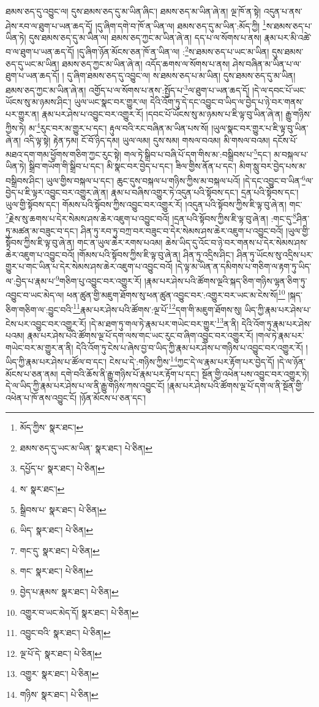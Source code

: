 ཐམས་ཅད་དུ་འབྱུང་ལ། དུས་ཐམས་ཅད་དུ་མ་ཡིན་ཞིང་། ཐམས་ཅད་མ་ཡིན་ཞེ་ན། ལྔ་ཁོ་ན་སྟེ། འདུན་པ་ནས་ཤེས་རབ་ལ་ཐུག་པ་ཡན་ཆད་དོ། །དུ་ཞིག་དགེ་བ་ཁོ་ན་ཡིན་ལ། ཐམས་ཅད་དུ་མ་ཡིན་:མོད་ཀྱི། \footnote{མོད་ཀྱིས་  སྣར་ཐང་། }ས་ཐམས་ཅད་པ་ཡིན་ཏེ། དུས་ཐམས་ཅད་དུ་མ་ཡིན་ལ། ཐམས་ཅད་ཀྱང་མ་ཡིན་ཞེ་ན། དད་པ་ལ་སོགས་པ་ནས། རྣམ་པར་མི་འཚེ་བ་ལ་ཐུག་པ་ཡན་ཆད་དོ། །དུ་ཞིག་ཉོན་མོངས་ཅན་ཁོ་ན་ཡིན་ལ། :\footnote{ཐམས་ཅད་དུ་ཡང་མ་ཡིན་  སྣར་ཐང་།  པེ་ཅིན། }ས་ཐམས་ཅད་པ་ཡང་མ་ཡིན། དུས་ཐམས་ཅད་དུ་ཡང་མ་ཡིན། ཐམས་ཅད་ཀྱང་མ་ཡིན་ཞེ་ན། འདོད་ཆགས་ལ་སོགས་པ་ནས། ཤེས་བཞིན་མ་ཡིན་པ་ལ་ཐུག་པ་ཡན་ཆད་དོ། །
དུ་ཞིག་ཐམས་ཅད་དུ་འབྱུང་ལ། ས་ཐམས་ཅད་པ་མ་ཡིན། དུས་ཐམས་ཅད་དུ་མ་ཡིན། ཐམས་ཅད་ཀྱང་མ་ཡིན་ཞེ་ན། འགྱོད་པ་ལ་སོགས་པ་ནས་:སྤྱོད་པ་\footnote{དཔྱོད་པ་  སྣར་ཐང་།  པེ་ཅིན། }ལ་ཐུག་པ་ཡན་ཆད་དོ། །དེ་ལ་དབང་པོ་ཡང་ཡོངས་སུ་མ་ཉམས་ཤིང་། ཡུལ་ཡང་སྣང་བར་གྱུར་ལ། དེའི་འོག་ཏུ་དེ་དང་འབྱུང་བ་ཡིད་ལ་བྱེད་པ་ཉེ་བར་གནས་པར་གྱུར་ན། རྣམ་པར་ཤེས་པ་འབྱུང་བར་འགྱུར་རོ། །དབང་པོ་ཡོངས་སུ་མ་ཉམས་པ་ཇི་ལྟ་བུ་ཡིན་ཞེ་ན། རྒྱུ་གཉིས་ཀྱིས་ཏེ། མ་\footnote{ས་  སྣར་ཐང་། }རུང་བར་མ་གྱུར་པ་དང་། རྟུལ་བའི་རང་བཞིན་མ་ཡིན་པས་སོ། །ཡུལ་སྣང་བར་གྱུར་པ་ཇི་ལྟ་བུ་ཡིན་ཞེ་ན། འདི་ལྟ་སྟེ། རྟེན་ཏམ། ངོ་བོ་ཉིད་དམ། ཡུལ་ལམ། དུས་སམ། གསལ་བའམ། མི་གསལ་བའམ། དངོས་པོ་མཐའ་དག་གམ་ཕྱོགས་གཅིག་ཀྱང་རུང་སྟེ། གལ་ཏེ་སྒྲིབ་པ་བཞི་པོ་དག་གིས་མ་:བསྒྲིབས་པ་\footnote{སྒྲིབས་པ་  སྣར་ཐང་།  པེ་ཅིན། }དང་། མ་བསྐལ་པ་ཡིན་ཏེ། སྒྲིབ་གཡོག་གི་སྒྲིབ་པ་དང་། མི་སྣང་བར་བྱེད་པ་དང་། ཟིལ་གྱིས་ནོན་པ་དང་། མིག་སླུ་བར་བྱེད་པས་མ་བསྒྲིབས་ཤིང་། ཡུལ་གྱིས་བསྐལ་པ་དང་། ཆུང་དུས་བསྐལ་པ་གཉིས་ཀྱིས་མ་བསྐལ་པའོ། །དེ་དང་འབྱུང་བ་ཡིན་\footnote{ཡིད་  སྣར་ཐང་།  པེ་ཅིན། }ལ་བྱེད་པ་ཇི་ལྟར་འབྱུང་བར་འགྱུར་ཞེ་ན། རྣམ་པ་བཞིས་འགྱུར་ཏེ་འདུན་པའི་སྟོབས་དང་། དྲན་པའི་སྟོབས་དང་། ཡུལ་གྱི་སྟོབས་དང་། གོམས་པའི་སྟོབས་ཀྱིས་འབྱུང་བར་འགྱུར་རོ། །འདུན་པའི་སྟོབས་ཀྱིས་ཇི་ལྟ་བུ་ཞེ་ན། གང་\footnote{གང་དུ་  སྣར་ཐང་།  པེ་ཅིན། }རྗེས་སུ་ཆགས་པ་དེར་སེམས་ཤས་ཆེར་འཇུག་པ་འབྱུང་བའོ། །དྲན་པའི་སྟོབས་ཀྱིས་ཇི་ལྟ་བུ་ཞེ་ན། :གང་དུ་\footnote{གང་  སྣར་ཐང་།  པེ་ཅིན། }ཤིན་ཏུ་མཚན་མ་བཟུང་བ་དང་། ཤིན་ཏུ་རབ་ཏུ་བཀྲ་བར་བཟུང་བ་དེར་སེམས་ཤས་ཆེར་འཇུག་པ་འབྱུང་བའོ། །ཡུལ་གྱི་སྟོབས་ཀྱིས་ཇི་ལྟ་བུ་ཞེ་ན། གང་ན་ཡུལ་ཆེར་རགས་པའམ། ཆེས་ཡིད་དུ་འོང་བ་ཉེ་བར་གནས་པ་དེར་སེམས་ཤས་ཆེར་འཇུག་པ་འབྱུང་བའོ། །གོམས་པའི་སྟོབས་ཀྱིས་ཇི་ལྟ་བུ་ཞེ་ན། ཤིན་ཏུ་འདྲིས་ཤིང་། ཤིན་ཏུ་ཡོངས་སུ་འདྲིས་པར་གྱུར་པ་གང་ཡིན་པ་དེར་སེམས་ཤས་ཆེར་འཇུག་པ་འབྱུང་བའོ། །དེ་ལྟ་མ་ཡིན་ན་དམིགས་པ་གཅིག་ལ་རྟག་ཏུ་ཡིད་ལ་:བྱེད་པ་རྣམ་པ་\footnote{བྱེད་པ་རྣམས་  སྣར་ཐང་།  པེ་ཅིན། }གཅིག་པུ་འབྱུང་བར་འགྱུར་རོ། །རྣམ་པར་ཤེས་པའི་ཚོགས་ལྔའི་སྐད་ཅིག་གཉིས་ལྷན་ཅིག་ཏུ་འབྱུང་བ་ཡང་མེད་ལ། ཕན་ཚུན་གྱི་མཇུག་ཐོགས་སུ་ཕན་ཚུན་འབྱུང་བར་:འགྱུར་བར་ཡང་མ་ངེས་སོ།\footnote{འགྱུར་བ་ཡང་མེད་དོ།  སྣར་ཐང་།  པེ་ཅིན། } །སྐད་ཅིག་གཅིག་ལ་:བྱུང་བའི་\footnote{འབྱུང་བའི་  སྣར་ཐང་།  པེ་ཅིན། }རྣམ་པར་ཤེས་པའི་ཚོགས་:ལྔ་པོ་\footnote{ལྔ་པོ་དེ་  སྣར་ཐང་།  པེ་ཅིན། }དག་གི་མཇུག་ཐོགས་སུ། ཡིད་ཀྱི་རྣམ་པར་ཤེས་པ་ངེས་པར་འབྱུང་བར་འགྱུར་རོ། །དེ་མ་ཐག་ཏུ་གལ་ཏེ་རྣམ་པར་གཡེང་བར་གྱུར་\footnote{འགྱུར་  སྣར་ཐང་།  པེ་ཅིན། }ན་ནི། དེའི་འོག་ཏུ་རྣམ་པར་ཤེས་པའམ། རྣམ་པར་ཤེས་པའི་ཚོགས་ལྔ་པོ་དག་ལས་གང་ཡང་རུང་བ་ཞིག་འབྱུང་བར་འགྱུར་རོ། །གལ་ཏེ་རྣམ་པར་གཡེང་བར་མ་གྱུར་ན་ནི། དེའི་འོག་ཏུ་ངེས་པ་ཞེས་བྱ་བ་ཡིད་ཀྱི་རྣམ་པར་ཤེས་པ་གཉིས་པ་འབྱུང་བར་འགྱུར་རོ། །ཡིད་ཀྱི་རྣམ་པར་ཤེས་པ་ཚོལ་བ་དང་། ངེས་པ་དེ་:གཉིས་ཀྱིས་\footnote{གཉིས་  སྣར་ཐང་།  པེ་ཅིན། }ཀྱང་དེ་ལ་རྣམ་པར་རྟོག་པར་བྱེད་དོ། །དེ་ལ་ཉོན་མོངས་པ་ཅན་ནམ། དགེ་བའི་ཆོས་ནི་རྒྱུ་གཉིས་པོ་རྣམ་པར་རྟོག་པ་དང་། སྔོན་གྱི་འཕེན་པས་འབྱུང་བར་འགྱུར་ཏེ། དེ་ལ་ཡིད་ཀྱི་རྣམ་པར་ཤེས་པ་ལ་ནི་རྒྱུ་གཉིས་ཀས་འབྱུང་ངོ། །རྣམ་པར་ཤེས་པའི་ཚོགས་ལྔ་པོ་དག་ལ་ནི་སྔོན་གྱི་འཕེན་པ་ཁོ་ནས་འབྱུང་ངོ། །ཉོན་མོངས་པ་ཅན་དང་། 